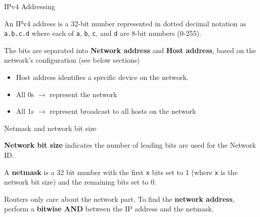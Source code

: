 


\begin{definition}
    {IPv4 Addressing}

    An IPv4 address is a 32-bit number represented in dotted decimal notation as \texttt{a.b.c.d} where each of \texttt{a}, \texttt{b}, \texttt{c}, and \texttt{d} are 8-bit numbers (0-255).

    The bits are separated into \textbf{Network address} and \textbf{Host address}, based on the network's configuration (see below sections)

    \begin{itemize}
        \item Host address identifies a specific device on the network.
        \item All 0s $\to$ represent the network
        \item All 1s $\to$ represent broadcast to all hosts on the network
    \end{itemize}
\end{definition}

\begin{theorem}
    {Netmask and network bit size}

    \textbf{Network bit size} indicates the number of leading bits are used for the Network ID.

    A \textbf{netmask} is a 32 bit number with the first \texttt{x} bits set to 1 (where \texttt{x} is the network bit size) and the remaining bits set to 0.

    Routers only care about the network part. To find the \textbf{network address}, perform a \textbf{bitwise AND} between the IP address and the netmask.
\end{theorem}

